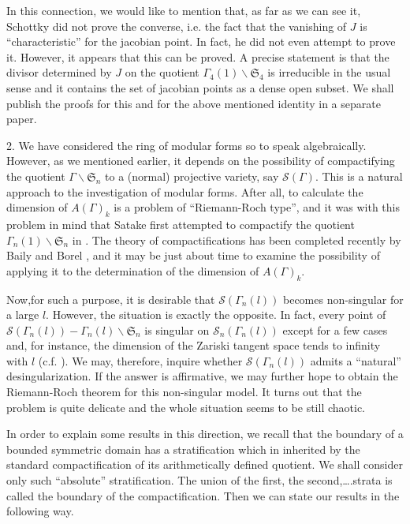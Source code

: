 In this connection, we would like to mention that, as far as we can see it, Schottky did not prove the converse, i.e. the fact that the vanishing of $J$ is ``characteristic'' for the jacobian point. In fact, he did not even attempt to prove it. However, it appears that this can be proved. A precise statement is that the divisor determined by $J$ on the quotient $\Gamma_{4}(1)\backslash \mathfrak{S}_{4}$ is irreducible in the usual sense and it contains the set of jacobian points as a dense open subset. We shall publish the proofs for this and for the above mentioned identity in a separate paper.

2. We have considered the ring of modular forms so to speak algebraically. However, as we mentioned earlier, it depends on the possibility of compactifying the quotient $\Gamma\backslash \mathfrak{S}_{n}$ to a (normal) projective variety, say $\mathscr{S}(\Gamma)$. This is a natural approach to the investigation of modular forms. After all, to calculate the dimension of $A(\Gamma)_{k}$ is a problem of ``Riemann-Roch type'', and it was with this problem in mind that Satake first attempted to compactify the quotient $\Gamma_{n}(1)\backslash\mathfrak{S}_{n}$ in \cite{art12-key18}. The theory of compactifications has been completed recently by Baily and Borel \cite{art12-key2}, and it may be just about time to examine the possibility of applying it to the determination of the dimension of $A(\Gamma)_{k}$.

Now,\pageoriginale for such a purpose, it is desirable that $\mathscr{S}(\Gamma_{n}(l))$ becomes non-singular for a large $l$. However, the situation is exactly the opposite. In fact, every point of $\mathscr{S}(\Gamma_{n}(l))-\Gamma_{n}(l)\backslash \mathfrak{S}_{n}$ is singular on $\mathscr{S}_{n}(\Gamma_{n}(l))$ except for a few cases and, for instance, the dimension of the Zariski tangent space tends to infinity with $l$ (c.f. \cite{art12-key10}). We may, therefore, inquire whether $\mathscr{S}(\Gamma_{n}(l))$ admits a ``natural'' desingularization. If the answer is affirmative, we may further hope to obtain the Riemann-Roch theorem for this non-singular model. It turns out that the problem is quite delicate and the whole situation seems to be still chaotic.

In order to explain some results in this direction, we recall that the boundary of a bounded symmetric domain has a stratification which in inherited by the standard compactification of its arithmetically defined quotient. We shall consider only such ``absolute'' stratification. The union of the first, the second,\ldots.strata is called the boundary of the compactification. Then we can state our results in the following way.

